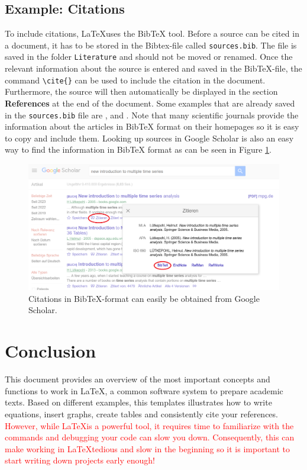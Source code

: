 \documentclass[12pt]{article}
\begin{document}
\subsection{Example: Citations}
To include citations, \LaTeX  uses the BibTeX tool. Before a source can be cited in a document, it has to be stored in the Bibtex-file called \texttt{sources.bib}. The file is saved in the folder \texttt{Literature} and should not be moved or renamed. Once the relevant information about the source is entered and saved in the BibTeX-file, the command \texttt{\textbackslash cite\{\}} can be used to include the citation in the document. Furthermore, the source will then automatically be displayed in the section \textbf{References} at the end of the document. Some examples that are already saved in the \texttt{sources.bib} file are \cite{brink2005anfertigung}, \cite{gopen1990science} and \cite{johnson1993get}. Note that many scientific journals provide the information about the articles in BibTeX format on their homepages so it is easy to copy and include them. Looking up sources in Google Scholar is also an easy way to find the information in BibTeX format as can be seen in Figure \ref{fig:bibtex_ex}. 
\begin{figure}[h!]
    \centering
    \includegraphics[scale=0.4]{Graphics/Bibtex_ex1.PNG}
    \caption{Citations in BibTeX-format can easily be obtained from Google Scholar.}
    \label{fig:bibtex_ex}
\end{figure} 

\section{Conclusion}\label{sec:conclusion}
This document provides an overview of the most important concepts and functions to work in \LaTeX, a common software system to prepare academic texts. Based on different examples, this templates illustrates how to write equations, insert graphs, create tables and consistently cite your references. \textcolor{red}{However, while \LaTeX is a powerful tool, it requires time to familiarize with the commands and debugging your code can slow you down. Consequently, this can make working in \LaTeX tedious and slow in the beginning so it is important to start writing down projects early enough!}
\newpage
\newpage
\end{document}
